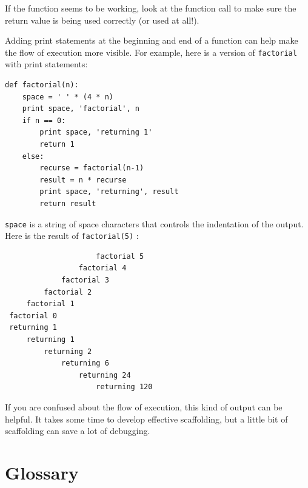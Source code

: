 \documentclass[10pt]{book}
\begin{document}
If the function seems to be working, look at the function call
to make sure the return value is being used correctly (or used
at all!).


Adding print statements at the beginning and end of a function
can help make the flow of execution more visible.
For example, here is a version of {\tt factorial} with
print statements:

\beforeverb
\begin{verbatim}
def factorial(n):
    space = ' ' * (4 * n)
    print space, 'factorial', n
    if n == 0:
        print space, 'returning 1'
        return 1
    else:
        recurse = factorial(n-1)
        result = n * recurse
        print space, 'returning', result
        return result
\end{verbatim}
\afterverb
%
{\tt space} is a string of space characters that controls the
indentation of the output.  Here is the result of {\tt factorial(5)} :

\beforeverb
\begin{verbatim}
                     factorial 5
                 factorial 4
             factorial 3
         factorial 2
     factorial 1
 factorial 0
 returning 1
     returning 1
         returning 2
             returning 6
                 returning 24
                     returning 120
\end{verbatim}
\afterverb
%
If you are confused about the flow of execution, this kind of
output can be helpful.  It takes some time to develop effective
scaffolding, but a little bit of scaffolding can save a lot of debugging.


\section{Glossary}
\end{document}
